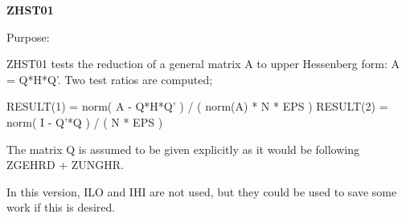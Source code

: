 {\bfseries Z\+H\+S\+T01} 

\begin{DoxyParagraph}{Purpose\+: }
\begin{DoxyVerb} ZHST01 tests the reduction of a general matrix A to upper Hessenberg
 form:  A = Q*H*Q'.  Two test ratios are computed;

 RESULT(1) = norm( A - Q*H*Q' ) / ( norm(A) * N * EPS )
 RESULT(2) = norm( I - Q'*Q ) / ( N * EPS )

 The matrix Q is assumed to be given explicitly as it would be
 following ZGEHRD + ZUNGHR.

 In this version, ILO and IHI are not used, but they could be used
 to save some work if this is desired.\end{DoxyVerb}
 
\end{DoxyParagraph}

